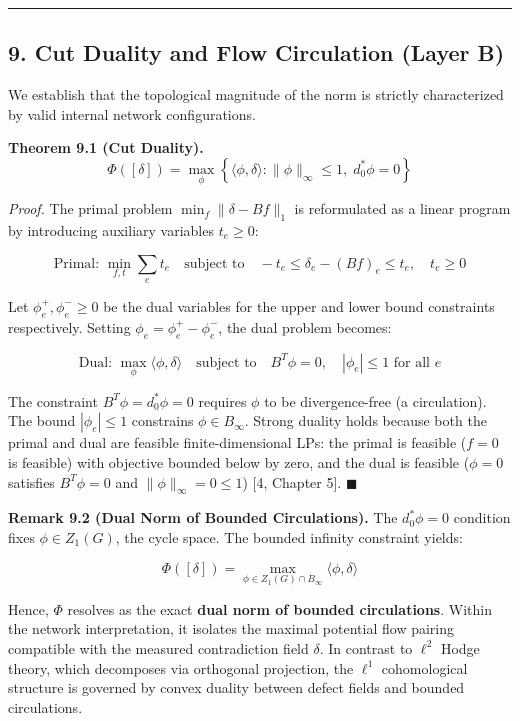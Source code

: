\documentclass[
]{article}
\begin{document}
\begin{center}\rule{0.5\linewidth}{0.5pt}\end{center}

\subsection{\texorpdfstring{9. Cut Duality and Flow Circulation
\textbf{(Layer
B)}}{9. Cut Duality and Flow Circulation (Layer B)}}\label{cut-duality-and-flow-circulation-layer-b}

We establish that the topological magnitude of the norm is strictly
characterized by valid internal network configurations.

\textbf{Theorem 9.1 (Cut Duality).}
\[ \Phi([\delta]) = \max_{\phi} \left\{ \langle \phi, \delta \rangle : \|\phi\|_\infty \leq 1, \; d_0^* \phi = 0 \right\} \]

\emph{Proof.} The primal problem \(\min_{f} \|\delta - B f\|_1\) is
reformulated as a linear program by introducing auxiliary variables
\(t_e \geq 0\):

\[\text{Primal: } \min_{f, t} \sum_e t_e \quad \text{subject to} \quad -t_e \leq \delta_e - (Bf)_e \leq t_e, \quad t_e \geq 0\]

Let \(\phi^+_e, \phi^-_e \geq 0\) be the dual variables for the upper
and lower bound constraints respectively. Setting
\(\phi_e = \phi^+_e - \phi^-_e\), the dual problem becomes:

\[\text{Dual: } \max_{\phi} \langle \phi, \delta \rangle \quad \text{subject to} \quad B^T \phi = 0, \quad |\phi_e| \leq 1 \text{ for all } e\]

The constraint \(B^T \phi = d_0^* \phi = 0\) requires \(\phi\) to be
divergence-free (a circulation). The bound \(|\phi_e| \leq 1\)
constrains \(\phi \in B_\infty\). Strong duality holds because both the
primal and dual are feasible finite-dimensional LPs: the primal is
feasible (\(f = 0\) is feasible) with objective bounded below by zero,
and the dual is feasible (\(\phi = 0\) satisfies \(B^T \phi = 0\) and
\(\|\phi\|_\infty = 0 \leq 1\)) {[}4, Chapter 5{]}. \(\blacksquare\)

\textbf{Remark 9.2 (Dual Norm of Bounded Circulations).} The
\(d_0^* \phi = 0\) condition fixes \(\phi \in Z_1(G)\), the cycle space.
The bounded infinity constraint yields:

\[ \Phi([\delta]) = \max_{\phi \in Z_1(G) \cap B_\infty} \langle \phi, \delta \rangle \]

Hence, \(\Phi\) resolves as the exact \textbf{dual norm of bounded
circulations}. Within the network interpretation, it isolates the
maximal potential flow pairing compatible with the measured
contradiction field \(\delta\). In contrast to \(\ell^2\) Hodge theory,
which decomposes via orthogonal projection, the \(\ell^1\) cohomological
structure is governed by convex duality between defect fields and
bounded circulations.
\end{document}
